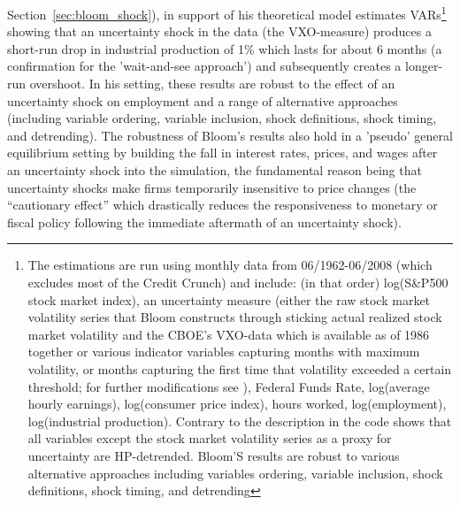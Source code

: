 \documentclass[a4paper,11pt,listof=nochaptergap,oneside,pointednumbers,bibtotoc,bigheadings,liststotoc]{scrbook}
\theoremstyle{mysatz}
\theoremstyle{mydefinition}
\theoremstyle{mybemerkung}
\begin{document}
Section~\ref{sec:bloom_shock}), in support of his theoretical model \citet{bloom:09} estimates VARs\footnote{The estimations are run using monthly data from 06/1962-06/2008 (which excludes most of the Credit Crunch) and include: (in that order) log(S\&P500 stock market index), an uncertainty measure (either the raw stock market volatility series that Bloom constructs through sticking actual realized stock market volatility and the CBOE's VXO-data which is available as of 1986 together or various indicator variables capturing months with maximum volatility, or months capturing the first time that volatility exceeded a certain threshold; for further modifications see \citealp{bloom:09}), Federal Funds Rate, log(average hourly earnings), log(consumer price index), hours worked, log(employment), log(industrial production). Contrary to the description in \citet{bloom:09} the code shows that all variables except the stock market volatility series as a proxy for uncertainty are HP-detrended. Bloom'S results are robust to various alternative approaches including variables ordering, variable inclusion, shock definitions, shock timing, and detrending} showing that an uncertainty shock in the data (the VXO-measure) produces a short-run drop in industrial production of 1\% which lasts for about 6 months (a confirmation for the ’wait-and-see approach’) and subsequently creates a longer-run overshoot. In his setting, these results are robust to the effect of an uncertainty shock on employment and a range of alternative approaches (including variable ordering, variable inclusion, shock definitions, shock timing, and detrending). The robustness of Bloom's results also hold in a 'pseudo' general equilibrium setting by building the fall in interest rates, prices, and wages after an uncertainty shock into the simulation, the fundamental reason being that uncertainty shocks make firms temporarily insensitive to price changes (the ``cautionary effect'' which drastically reduces the responsiveness to monetary or fiscal policy following the immediate aftermath of an uncertainty shock).
\end{document}
